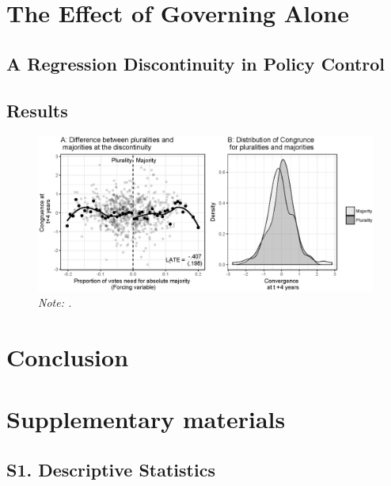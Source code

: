 \documentclass[a4paper,11pt]{article}
\newcommand\fnote[1]{\captionsetup{font=small}\caption*{#1}}
\newcommand{\beginsupplement}{%
	\setcounter{table}{0}
	\renewcommand{\thetable}{S.\arabic{table}}%
	\setcounter{figure}{0}
	\renewcommand{\thefigure}{S.\arabic{figure}}%
}
\begin{document}
\section{The Effect of Governing Alone}

\subsection{A Regression Discontinuity in Policy Control}

\subsection{Results}

\begin{landscape}
	\begin{figure}[h]
		\centering
		\includegraphics[scale = 1]{rddCongruence.eps}
		\caption{\textbf{.}} \fnote{\emph{Note: .}}
		\label{fig:PermTest}
	\end{figure}
\end{landscape}
	
\section{Conclusion}






\beginsupplement

\section{Supplementary materials}

\subsection{S1. Descriptive Statistics}

	
\end{document}

